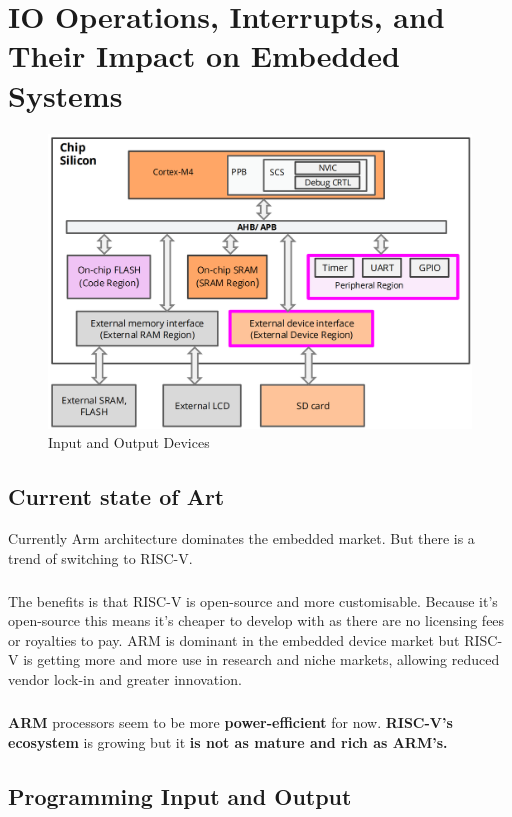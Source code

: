 \chapter{IO Operations, Interrupts, and Their Impact on Embedded Systems}

\begin{figure}[H]
    \centering
    \includegraphics[width=0.8\linewidth]{img/image40.png}
    \caption{Input and Output Devices}
\end{figure}

\section{Current state of Art}
Currently Arm architecture dominates the embedded market. But there is a trend of switching to RISC-V.


\paragraph{}
The benefits is that RISC-V is open-source and more customisable. Because it's open-source this means
it's cheaper to develop with as there are no licensing fees or royalties to pay. ARM is dominant in the
embedded device market but RISC-V is getting more and more use in research and niche markets,
allowing reduced vendor lock-in and greater innovation.

\paragraph{}
\textbf{ARM} processors seem to be more \textbf{power-efficient} for now. \textbf{RISC-V's ecosystem} is growing but it \textbf{is not as
mature and rich as ARM's.}

\newpage
\section{Programming Input and Output}

